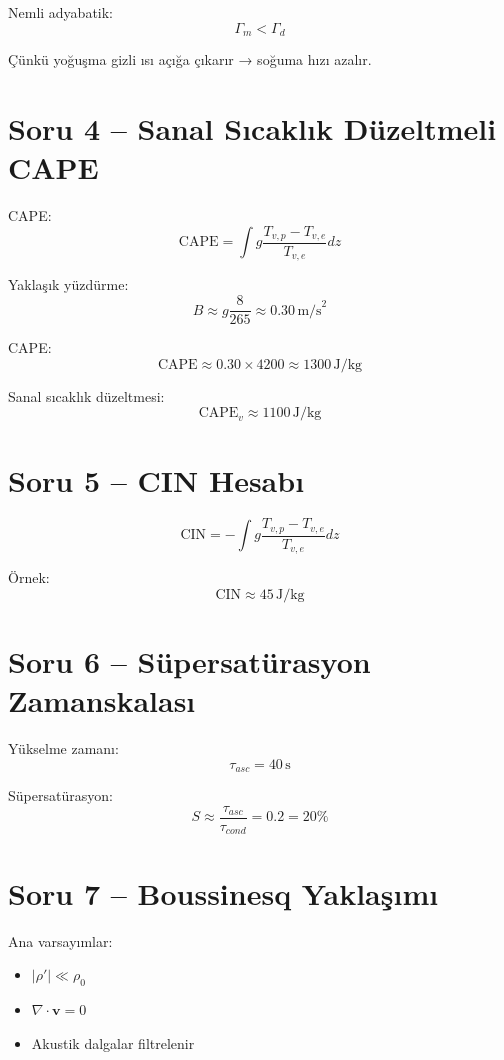 \documentclass[12pt,a4paper]{article}
\begin{document}
Nemli adyabatik:
\[
\Gamma_m < \Gamma_d
\]

Çünkü yoğuşma gizli ısı açığa çıkarır → soğuma hızı azalır.

\section*{Soru 4 -- Sanal Sıcaklık Düzeltmeli CAPE}

CAPE:
\[
\text{CAPE} = \int g \frac{T_{v,p} - T_{v,e}}{T_{v,e}} dz
\]

Yaklaşık yüzdürme:
\[
B \approx g \frac{8}{265} \approx 0.30 \, \text{m/s}^2
\]

CAPE:
\[
\text{CAPE} \approx 0.30 \times 4200 \approx 1300 \, \text{J/kg}
\]

Sanal sıcaklık düzeltmesi:
\[
\text{CAPE}_v \approx 1100 \, \text{J/kg}
\]

\section*{Soru 5 -- CIN Hesabı}

\[
\text{CIN} = -\int g \frac{T_{v,p}-T_{v,e}}{T_{v,e}} dz
\]

Örnek:
\[
\text{CIN} \approx 45\, \text{J/kg}
\]

\section*{Soru 6 -- Süpersatürasyon Zamanskalası}

Yükselme zamanı:
\[
\tau_{asc} = 40\, \text{s}
\]

Süpersatürasyon:
\[
S \approx \frac{\tau_{asc}}{\tau_{cond}} = 0.2 = 20\%
\]

\section*{Soru 7 -- Boussinesq Yaklaşımı}

Ana varsayımlar:
\begin{itemize}
  \item \(|\rho'| \ll \rho_0\)
  \item \(\nabla \cdot \mathbf{v} = 0\)
  \item Akustik dalgalar filtrelenir
\end{itemize}
\end{document}
